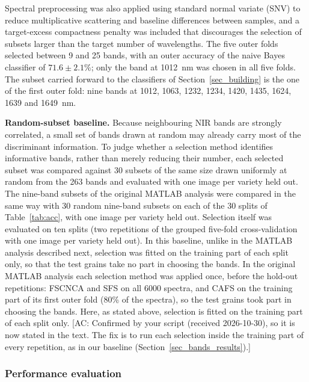 \documentclass[final,5p,times,twocolumn]{elsarticle}
\newcommand{\added}[1]{{\color{blue}#1}}
\newcommand{\acnote}[1]{{\color{red}\small\textsf{[AC: #1]}}}
\begin{document}
\begin{itemize}
     Spectral preprocessing was also applied using standard normal \added{variate} (SNV) to reduce multiplicative scattering and baseline differences between samples, and a target-excess compactness penalty was included that discourages the selection of subsets larger than the target number of wavelengths. 
     \added{The five outer folds selected between 9 and 25 bands, with an outer accuracy of the naive Bayes classifier of $71.6\pm2.1$\%; only the band at 1012~nm was chosen in all five folds. The subset carried forward to the classifiers of Section~\ref{sec_building} is the one of the first outer fold: nine bands at 1012, 1063, 1232, 1234, 1420, 1435, 1624, 1639 and 1649~nm.}
        
\end{itemize}

\added{\textbf{Random-subset baseline.} Because neighbouring NIR bands are strongly correlated, a small set of bands drawn at random may already carry most of the discriminant information. To judge whether a selection method identifies informative bands, rather than merely reducing their number, each selected subset was compared against 30 subsets of the same size drawn uniformly at random from the 263 bands and evaluated with one image per variety held out. The nine-band subsets of the original MATLAB analysis were compared in the same way with 30 random nine-band subsets on each of the 30 splits of Table~\ref{tab:acc}, with one image per variety held out. Selection itself was evaluated on ten splits (two repetitions of the grouped five-fold cross-validation with one image per variety held out). In this baseline, unlike in the MATLAB analysis described next, selection was fitted on the training part of each split only, so that the test grains take no part in choosing the bands.}
\added{In the original MATLAB analysis each selection method was applied once, before the hold-out repetitions: FSCNCA and SFS on all 6000 spectra, and CAFS on the training part of its first outer fold (80\% of the spectra), so the test grains took part in choosing the bands. Here, as stated above, selection is fitted on the training part of each split only.}
\acnote{Confirmed by your script (received 2026-10-30), so it is now stated in the text. The fix is to run each selection inside the training part of every repetition, as in our baseline (Section~\ref{sec_bands_results}).}

\subsubsection{Performance evaluation}\label{sec_performance}
\end{document}

